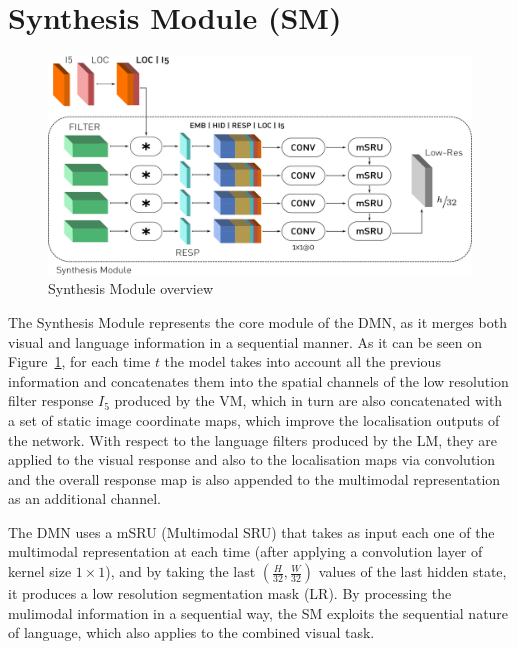 \section{Synthesis Module (SM)}
\begin{figure}
\centering
\includegraphics[width=0.9\columnwidth]{./figures/Syn_Module.pdf}
\caption{Synthesis Module overview}
\label{Fig:SM}
\end{figure}

The Synthesis Module represents the core module of the DMN, as it merges both visual and language information in a sequential manner. As it can be seen on Figure~\ref{Fig:SM}, for each time $t$ the model takes into account all the previous information and concatenates them into the spatial channels of the low resolution filter response $I_5$ produced by the VM, which in turn are also concatenated with a set of static image coordinate maps, which improve the localisation outputs of the network. With respect to the language filters produced by the LM, they are applied to the visual response and also to the localisation maps via convolution and the overall response map is also appended to the multimodal representation as an additional channel.

The DMN uses a mSRU (Multimodal SRU) that takes as input each one of the multimodal representation at each time (after applying a convolution layer of kernel size $1 \times 1$), and by taking the last $\left(\frac{H}{32}, \frac{W}{32}\right)$ values of the last hidden state, it produces a low resolution segmentation mask (LR). By processing the mulimodal information in a sequential way, the SM exploits the sequential nature of language, which also applies to the combined visual task.


